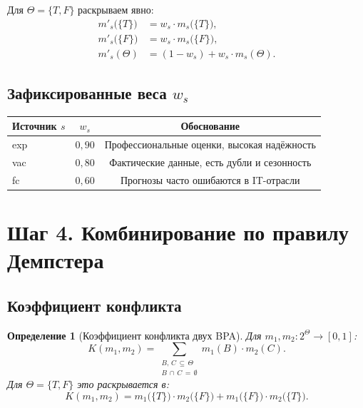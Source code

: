\documentclass[12pt,a4paper]{article}
\newtheorem{definition}{Определение}
\begin{document}
\noindent
Для $\Theta = \{T, F\}$ раскрываем явно:
\begin{align*}
  m'_s\!\bigl(\{T\}\bigr) &= w_s \cdot m_s\!\bigl(\{T\}\bigr), \\
  m'_s\!\bigl(\{F\}\bigr) &= w_s \cdot m_s\!\bigl(\{F\}\bigr), \\
  m'_s(\Theta)             &= (1 - w_s) + w_s \cdot m_s(\Theta).
\end{align*}

\subsection{Зафиксированные веса $w_s$}

\begin{center}
\begin{tabular}{lcc}
\toprule
Источник $s$ & $w_s$ & Обоснование \\
\midrule
exp  & $0{,}90$ & Профессиональные оценки, высокая надёжность \\
vac  & $0{,}80$ & Фактические данные, есть дубли и сезонность \\
fc   & $0{,}60$ & Прогнозы часто ошибаются в IT-отрасли \\
\bottomrule
\end{tabular}
\end{center}

\section{Шаг 4. Комбинирование по правилу Демпстера}

\subsection{Коэффициент конфликта}

\begin{definition}[Коэффициент конфликта двух BPA]
  Для $m_1, m_2 : 2^\Theta \to [0,1]$:
  \[
    K(m_1, m_2)
      = \sum_{\substack{B,\, C \,\subseteq\, \Theta \\ B \,\cap\, C \,=\, \emptyset}}
          m_1(B) \cdot m_2(C).
  \]
  Для $\Theta = \{T, F\}$ это раскрывается в:
  \[
    K(m_1, m_2)
      = m_1\!\bigl(\{T\}\bigr) \cdot m_2\!\bigl(\{F\}\bigr)
      + m_1\!\bigl(\{F\}\bigr) \cdot m_2\!\bigl(\{T\}\bigr).
  \]
\end{definition}
\end{document}
